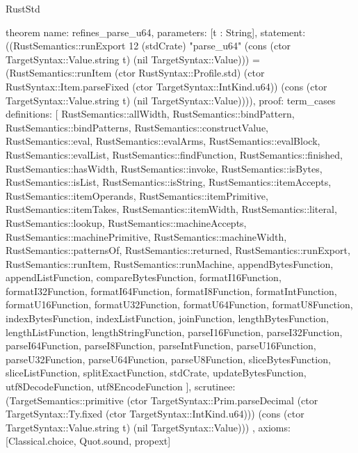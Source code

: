 \begin{lexlean}{RustStd}
\begin{semanticmodule}
theorem{
  name: refines_parse_u64,
  parameters: [t : String],
  statement: ((RustSemantics::runExport 12 (stdCrate) "parse_u64" (cons (ctor TargetSyntax::Value.string t) (nil TargetSyntax::Value))) = (RustSemantics::runItem (ctor RustSyntax::Profile.std) (ctor RustSyntax::Item.parseFixed (ctor TargetSyntax::IntKind.u64)) (cons (ctor TargetSyntax::Value.string t) (nil TargetSyntax::Value)))),
  proof: term_cases{
    definitions: [
      RustSemantics::allWidth,
      RustSemantics::bindPattern,
      RustSemantics::bindPatterns,
      RustSemantics::constructValue,
      RustSemantics::eval,
      RustSemantics::evalArms,
      RustSemantics::evalBlock,
      RustSemantics::evalList,
      RustSemantics::findFunction,
      RustSemantics::finished,
      RustSemantics::hasWidth,
      RustSemantics::invoke,
      RustSemantics::isBytes,
      RustSemantics::isList,
      RustSemantics::isString,
      RustSemantics::itemAccepts,
      RustSemantics::itemOperands,
      RustSemantics::itemPrimitive,
      RustSemantics::itemTakes,
      RustSemantics::itemWidth,
      RustSemantics::literal,
      RustSemantics::lookup,
      RustSemantics::machineAccepts,
      RustSemantics::machinePrimitive,
      RustSemantics::machineWidth,
      RustSemantics::patternsOf,
      RustSemantics::returned,
      RustSemantics::runExport,
      RustSemantics::runItem,
      RustSemantics::runMachine,
      appendBytesFunction,
      appendListFunction,
      compareBytesFunction,
      formatI16Function,
      formatI32Function,
      formatI64Function,
      formatI8Function,
      formatIntFunction,
      formatU16Function,
      formatU32Function,
      formatU64Function,
      formatU8Function,
      indexBytesFunction,
      indexListFunction,
      joinFunction,
      lengthBytesFunction,
      lengthListFunction,
      lengthStringFunction,
      parseI16Function,
      parseI32Function,
      parseI64Function,
      parseI8Function,
      parseIntFunction,
      parseU16Function,
      parseU32Function,
      parseU64Function,
      parseU8Function,
      sliceBytesFunction,
      sliceListFunction,
      splitExactFunction,
      stdCrate,
      updateBytesFunction,
      utf8DecodeFunction,
      utf8EncodeFunction
    ],
    scrutinee: (TargetSemantics::primitive (ctor TargetSyntax::Prim.parseDecimal (ctor TargetSyntax::Ty.fixed (ctor TargetSyntax::IntKind.u64))) (cons (ctor TargetSyntax::Value.string t) (nil TargetSyntax::Value)))
  },
  axioms: [Classical.choice, Quot.sound, propext]
}


\end{semanticmodule}
\end{lexlean}
